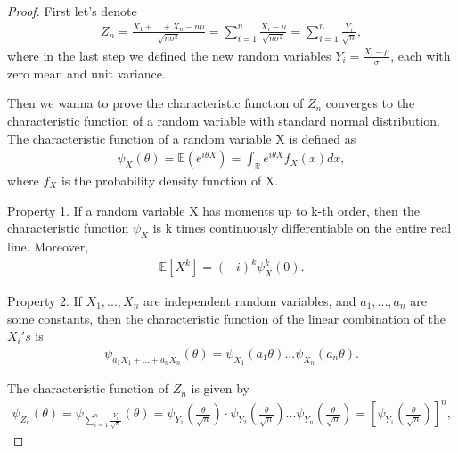 \begin{proof}
First let's denote
\begin{align}
Z_n=\frac{X_1+...+X_n-n\mu}{ \sqrt{n \sigma^2}}=\sum_{i=1}^{n} \frac{X_i-\mu}{ \sqrt{n \sigma^2}}=\sum_{i=1}^{n} \frac{Y_i}{ \sqrt{n }},
\end{align}
where  in the last step we defined the new random variables $Y_i=\frac{X_i-\mu}{ \sigma}$, each with zero mean and unit variance.

Then we wanna to prove the characteristic function of $Z_n$ converges to the characteristic function of a random variable with standard normal distribution.
The characteristic function of a random variable X is defined as
\begin{align}
\psi_X(\theta)=\mathbb{E}(e^{i\theta X})=\int_\mathbb{R}e^{i\theta X} f_X(x)dx,
\end{align}
where $f_X$ is the probability density function of X.

Property 1. If a random variable X has moments up to k-th order, then the characteristic function $\psi_X$ is k times continuously differentiable on the entire real line. Moreover,
\begin{align}
\mathbb{E}[X^k]=(-i)^k \psi_X^k(0).
\end{align}

Property 2. If $X_1,...,X_n$ are independent random variables, and $a_1,...,a_n$ are some constants, then the characteristic function of the linear combination of the $X_i's$ is
\begin{align}
\psi_{a_1 X_1+...+a_n X_n}(\theta)=\psi_{X_1}(a_1\theta)...\psi_{X_n}(a_n\theta).
\end{align}

The characteristic function of $Z_n$ is given by
\begin{align}
\psi_{Z_n}(\theta)=\psi_{\sum_{i=1}^{n} \frac{Y_i}{ \sqrt{n }}}(\theta)=\psi_{Y_1}(\frac{\theta}{ \sqrt{n }})\cdot \psi_{Y_2}(\frac{\theta}{ \sqrt{n }})...\psi_{Y_n}(\frac{\theta}{ \sqrt{n }})=[\psi_{Y_1}(\frac{\theta}{ \sqrt{n }})]^n,
\end{align}


\end{proof}
